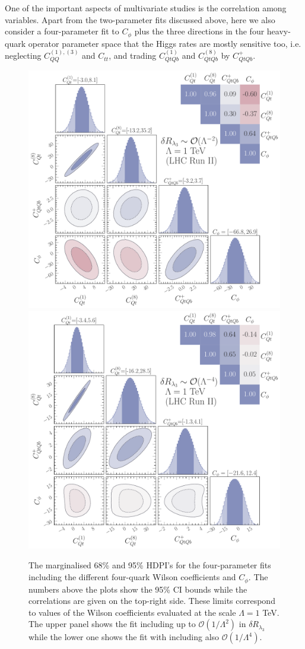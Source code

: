 One of the important aspects of multivariate studies is the correlation among variables. Apart from the two-parameter fits discussed above, here we also consider a four-parameter fit to $C_\phi$ plus the three directions in the four heavy-quark operator parameter space that the Higgs rates are
mostly sensitive too, i.e. neglecting $C_{QQ}^{(1),(3) }$ and $C_{tt}$, and trading $C_{QtQb}^{(1)}$ and $C_{QtQb}^{(8)}$ by $C_{QtQb}^{+}$.
\begin{figure}[t!]
	\begin{center}
		\includegraphics[width=.6\linewidth]{fig/4param_fit_LHC_RunII_l3L_rge}\\
		\includegraphics[width=.6\linewidth]{fig/4param_fit_LHC_RunII_l3Q_rge}
	\end{center}
	\caption{The marginalised 68\% and 95\% HDPI's for the four-parameter fits including the different four-quark Wilson coefficients and $C_\phi$. The numbers above the plots show the 95\% CI bounds while the correlations are given on the top-right side. 
		These limits correspond to values of the Wilson coefficients evaluated at the scale $\Lambda=1$ TeV. 
		The upper panel shows the fit including up to $\mathcal{O}(1/\Lambda^2)$ in $\delta R_{\lambda_3}$  while the lower one shows the fit with including also  $\mathcal{O}(1/\Lambda^4)$.  \label{fig:4param} }
\end{figure}
